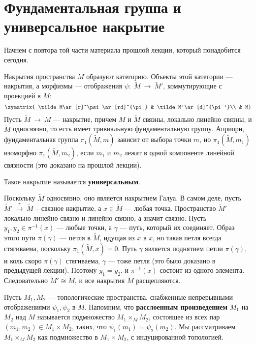 \documentclass[12pt]{book}
\newcommand{\arrow}{{\:\longrightarrow\:}}
\theoremstyle{upshape}
\theoremstyle{generic}
\theoremstyle{upshapenonumber}
\newcommand{\следствие}{%
     \refstepcounter{teorema}
     {\noindent\bf Следствие \thechapter.\arabic{teorema}:\ }}
\newcommand{\пример}{%
     \refstepcounter{teorema}
     {\noindent\bf Пример \thechapter.\arabic{teorema}:\ }}
\newcommand{\лемма}{%
     \refstepcounter{teorema}
     {\noindent\bf Лемма \thechapter.\arabic{teorema}:\ }}
\newcommand{\теорема}{%
     \refstepcounter{teorema}
     {\noindent\bf Теорема \thechapter.\arabic{teorema}:\ }}
\newcommand{\утверждение}{%
     \refstepcounter{teorema}
     {\noindent\bf Утверждение \thechapter.\arabic{teorema}:\ }}
\def\бф{\bf}
\begin{document}

\section{Фундаментальная группа и универсальное накрытие}

Начнем с повтора той части материала прошлой
лекции, который понадобится сегодня.

Накрытия пространства $M$ образуют категорию. Объекты
этой категории --- накрытия, а морфизмы --- отображения
$\psi:\; \tilde M \arrow \tilde M'$, коммутирующие с
проекцией в $M$:
\[
\xymatrix{
\tilde M\ar[r]^\psi\ar[rd]^{\pi} & \tilde M'\ar[d]^{\pi'}\\
& M}
\]
Пусть $\tilde M  \arrow M$ --- накрытие,
причем $M$ и $\tilde M$ связны, локально линейно связны,
и $\tilde M$ односвязно, то есть имеет тривиальную
фундаментальную группу. Априори, фундаментальная 
группа $\pi_1(\tilde M,m)$ зависит от выбора точки 
$m$,  но $\pi_1(\tilde M,m_1)$ изоморфно $\pi_1(\tilde M,m_2)$,
если $m_1$ и $m_2$ лежат в одной компоненте линейной связности
(это доказано на прошлой лекции). 

Такое накрытие называется {\бф универсальным}.

Поскольку $\tilde M$ односвязно, оно является накрытием Галуа.
В самом деле, пусть $\tilde M' \stackrel \pi\arrow \tilde M$ --
связное накрытие, а $x\in \tilde M$ --- любая точка.
Пространство $\tilde M'$ локально линейно связно и
линейно связно, а значит связно.
Пусть $y_1, y_2\in \pi^{-1}(x)$ --- любые точки, а
$\gamma$ --- путь, который их соединяет. Образ этого пути
$\pi(\gamma)$ --- петля в $\tilde M$, идущая из $x$ в $x$,
но такая петля всегда стягиваема, поскольку $\pi_1(\tilde M, x)=0$.
Путь $\gamma$ является поднятием петли $\pi(\gamma)$,
и коль скоро $\pi(\gamma)$ стягиваема, $\gamma$ --- тоже петля
(это было доказано в предыдущей лекции). Поэтому 
$y_1=y_2$, и $\pi^{-1}(x)$  состоит из одного элемента.
Следовательно $\tilde M'\cong \tilde M$, и все накрытия $\tilde M$
расщепляются.


Пусть $M_1, M_2$ --- топологические пространства, снабженные
непрерывными отображениями $\psi_1, \psi_2$ в $M$.
Напомним, что {\бф расслоенным произведением}
$M_1$ на $M_2$ над $M$ называется
подмножество $M_1\times_M M_2$, состоящее
из всех пар $(m_1, m_2)\in M_1\times M_2$, таких, 
что $\psi_1(m_1)=\psi_2(m_2)$. Мы рассматриваем 
$M_1\times_M M_2$ как подмножество в $M_1\times M_2$,
с индуцированной топологией.
\end{document}
